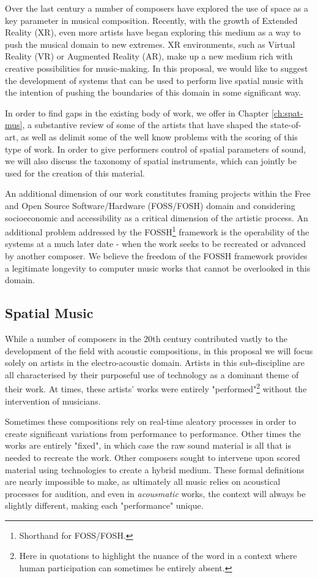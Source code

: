 Over the last century a number of composers have explored the use of space as a key parameter in musical composition. Recently, with the growth of Extended Reality (XR), even more artists have began exploring this medium as a way to push the musical domain to new extremes. XR environments, such as Virtual Reality (VR) or Augmented Reality (AR), make up a new medium rich with creative possibilities for music-making. In this proposal, we would like to suggest the development of systems that can be used to perform live spatial music with the intention of pushing the boundaries of this domain in some significant way. 

In order to find gaps in the existing body of work, we offer in Chapter \ref{ch:spat-mus}, a substantive review of some of the artists that have shaped the state-of-art, as well as delimit some of the well know problems with the scoring of this type of work. In order to give performers control of spatial parameters of sound, we will also discuss the taxonomy of spatial instruments, which can jointly be used for the creation of this material. 

An additional dimension of our work constitutes framing projects within the Free and Open Source Software/Hardware (FOSS/FOSH) domain and considering socioeconomic and accessibility as a critical dimension of the artistic process. An additional problem addressed by the FOSSH\footnote{Shorthand for FOSS/FOSH.} framework is the operability of the systems at a much later date - when the work seeks to be recreated or advanced by another composer. We believe the freedom of the FOSSH framework provides a legitimate longevity to computer music works that cannot be overlooked in this domain. 

\subsection{Spatial Music} 
While a number of composers in the 20th century contributed vastly to the development of the field with acoustic compositions, in this proposal we will focus solely on artists in the electro-acoustic domain. Artists in this sub-discipline are all characterised by their purposeful use of technology as a dominant theme of their work. At times, these artists' works were entirely "performed"\footnote{Here in quotations to highlight the nuance of the word in a context where human participation can sometimes be entirely absent.} without the intervention of musicians. 

Sometimes these compositions rely on real-time aleatory processes in order to create significant variations from performance to performance. Other times the works are entirely "fixed", in which case the raw sound material is all that is needed to recreate the work. Other composers sought to intervene upon scored material using technologies to create a hybrid medium. These formal definitions are nearly impossible to make, as ultimately all music relies on acoustical processes for audition, and even in \textit{acousmatic} works, the context will always be slightly different, making each "performance" unique.


